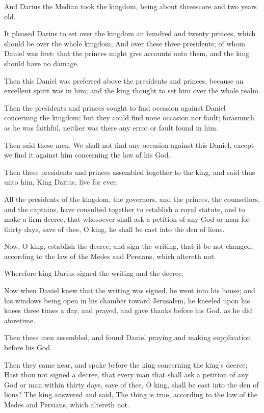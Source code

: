 \Verse And Darius the Median took the kingdom, being about threescore and two years old.


\Chapter
\Verse It pleased Darius to set over the kingdom an hundred and twenty princes, which should be over the whole kingdom; \Verse And over these three presidents; of whom Daniel was first: that the princes might give accounts unto them, and the king should have no damage.

\Verse Then this Daniel was preferred above the presidents and princes, because an excellent spirit was in him; and the king thought to set him over the whole realm.

\Verse Then the presidents and princes sought to find occasion against Daniel concerning the kingdom; but they could find none occasion nor fault; forasmuch as he was faithful, neither was there any error or fault found in him.

\Verse Then said these men, We shall not find any occasion against this Daniel, except we find it against him concerning the law of his God.

\Verse Then these presidents and princes assembled together to the king, and said thus unto him, King Darius, live for ever.

\Verse All the presidents of the kingdom, the governors, and the princes, the counsellors, and the captains, have consulted together to establish a royal statute, and to make a firm decree, that whosoever shall ask a petition of any God or man for thirty days, save of thee, O king, he shall be cast into the den of lions.

\Verse Now, O king, establish the decree, and sign the writing, that it be not changed, according to the law of the Medes and Persians, which altereth not.

\Verse Wherefore king Darius signed the writing and the decree.

\Verse Now when Daniel knew that the writing was signed, he went into his house; and his windows being open in his chamber toward Jerusalem, he kneeled upon his knees three times a day, and prayed, and gave thanks before his God, as he did aforetime.

\Verse Then these men assembled, and found Daniel praying and making supplication before his God.

\Verse Then they came near, and spake before the king concerning the king's decree; Hast thou not signed a decree, that every man that shall ask a petition of any God or man within thirty days, save of thee, O king, shall be cast into the den of lions? The king answered and said, The thing is true, according to the law of the Medes and Persians, which altereth not.

